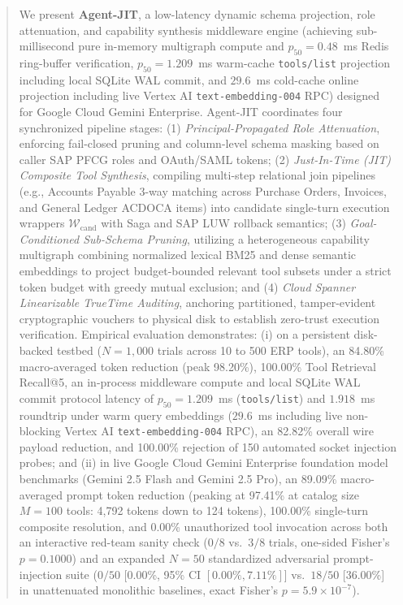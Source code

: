 \documentclass[conference,10pt]{IEEEtran}
\begin{document}
\begin{abstract}
We present \textbf{Agent-JIT}, a low-latency dynamic schema projection, role attenuation, and capability synthesis middleware engine (achieving sub-millisecond pure in-memory multigraph compute and $p_{50} = 0.48$~ms Redis ring-buffer verification, $p_{50} = 1.209$~ms warm-cache \texttt{tools/list} projection including local SQLite WAL commit, and $29.6$~ms cold-cache online projection including live Vertex AI \texttt{text-embedding-004} RPC) designed for Google Cloud Gemini Enterprise. Agent-JIT coordinates four synchronized pipeline stages: (1) \emph{Principal-Propagated Role Attenuation}, enforcing fail-closed pruning and column-level schema masking based on caller SAP PFCG roles and OAuth/SAML tokens; (2) \emph{Just-In-Time (JIT) Composite Tool Synthesis}, compiling multi-step relational join pipelines (e.g., Accounts Payable 3-way matching across Purchase Orders, Invoices, and General Ledger ACDOCA items) into candidate single-turn execution wrappers $\mathcal{W}_{\text{cand}}$ with Saga and SAP LUW rollback semantics; (3) \emph{Goal-Conditioned Sub-Schema Pruning}, utilizing a heterogeneous capability multigraph combining normalized lexical BM25 and dense semantic embeddings to project budget-bounded relevant tool subsets under a strict token budget with greedy mutual exclusion; and (4) \emph{Cloud Spanner Linearizable TrueTime Auditing}, anchoring partitioned, tamper-evident cryptographic vouchers to physical disk to establish zero-trust execution verification. Empirical evaluation demonstrates: (i) on a persistent disk-backed testbed ($N = 1{,}000$ trials across 10 to 500 ERP tools), an 84.80\% macro-averaged token reduction (peak 98.20\%), 100.00\% Tool Retrieval Recall@5, an in-process middleware compute and local SQLite WAL commit protocol latency of $p_{50} = 1.209$~ms (\texttt{tools/list}) and $1.918$~ms roundtrip under warm query embeddings ($29.6$~ms including live non-blocking Vertex AI \texttt{text-embedding-004} RPC), an 82.82\% overall wire payload reduction, and 100.00\% rejection of 150 automated socket injection probes; and (ii) in live Google Cloud Gemini Enterprise foundation model benchmarks (Gemini 2.5 Flash and Gemini 2.5 Pro), an 89.09\% macro-averaged prompt token reduction (peaking at 97.41\% at catalog size $M = 100$ tools: 4,792 tokens down to 124 tokens), 100.00\% single-turn composite resolution, and 0.00\% unauthorized tool invocation across both an interactive red-team sanity check ($0/8$ vs.\ $3/8$ trials, one-sided Fisher's $p = 0.1000$) and an expanded $N = 50$ standardized adversarial prompt-injection suite ($0/50$ [0.00\%, 95\% CI $[0.00\%, 7.11\%]$] vs.\ $18/50$ [36.00\%] in unattenuated monolithic baselines, exact Fisher's $p = 5.9 \times 10^{-7}$).
\end{abstract}
\end{document}
